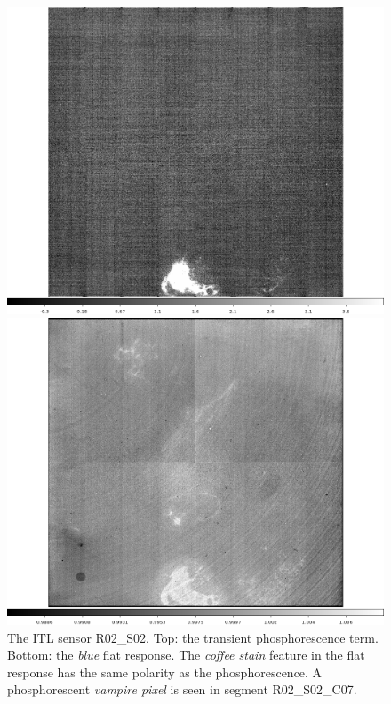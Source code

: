 \begin{figure}[!htbp]
\centering
\begin{minipage}{1.0\textwidth}    
  \centering
  \includegraphics[width=.6\linewidth]{sections/figures/phosphorescence-survey/stains_phos_R02_S02.png}    
\end{minipage}
\begin{minipage}{1.0\textwidth}
  \centering
  \includegraphics[width=.6\linewidth]{sections/figures/phosphorescence-survey/stains_abs_R02_S02.png}
\end{minipage}
\caption{The ITL sensor R02\_S02. Top: the transient phosphorescence term. Bottom: the {\it blue} flat response. The {\it coffee stain} feature in the flat response has the same polarity as the phosphorescence. A phosphorescent {\it vampire pixel} is seen in segment R02\_S02\_C07.}
\label{fig:phos:stains:R02S02}
\end{figure}

